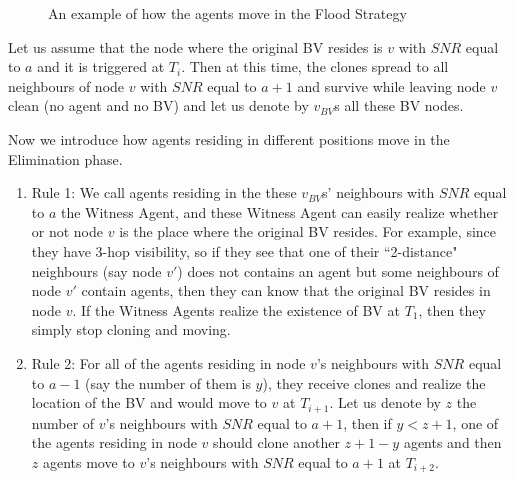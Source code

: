 \begin{figure} [H]
      \hspace{1in} 
  \caption{An example of how the agents move in the Flood Strategy} 
  \label{fig:Arbiflood} %
\end{figure}

Let us assume that the node where the original BV resides is $v$ with $SNR$ equal to $a$ and it is triggered at $T_i$. Then at this time, the clones spread to all neighbours of node $v$ with $SNR$ equal to $a+1$ and survive while leaving node $v$ clean (no agent and no BV) and let us denote by $v_{BV}$s all these BV nodes.  

Now we introduce how agents residing in different positions move in the Elimination phase.
\begin{enumerate}

\item Rule 1: We call agents residing in the these $v_{BV}$s' neighbours with $SNR$ equal to $a$ the Witness Agent, and these Witness Agent can easily realize whether or not node $v$ is the place where the original BV resides. For example, since they have 3-hop visibility, so if they see that one of their ``2-distance" neighbours (say node $v'$) does not contains an agent but some neighbours of node $v'$ contain agents, then they can know that the original BV resides in node $v$. If the Witness Agents realize the existence of BV at $T_1$, then they simply stop cloning and moving. 

\item Rule 2: For all of the agents residing in node $v$'s neighbours with $SNR$ equal to $a-1$ (say the number of them is $y$), they receive clones and realize the location of the BV and would move to $v$ at $T_{i+1}$. Let us denote by $z$ the number of $v$'s neighbours with $SNR$ equal to $a+1$, then if $y< z+1$, one of the agents residing in node $v$ should clone another $z+1-y$ agents and then $z$ agents move to $v$'s neighbours with $SNR$ equal to $a+1$ at $T_{i+2}$.
\end{enumerate}

